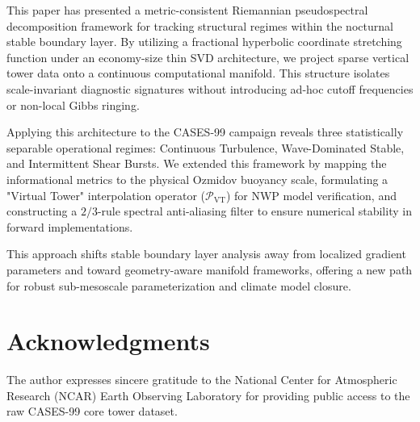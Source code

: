 This paper has presented a metric-consistent Riemannian pseudospectral decomposition framework for tracking structural regimes within the nocturnal stable boundary layer. By utilizing a fractional hyperbolic coordinate stretching function under an economy-size thin SVD architecture, we project sparse vertical tower data onto a continuous computational manifold. This structure isolates scale-invariant diagnostic signatures without introducing ad-hoc cutoff frequencies or non-local Gibbs ringing.

Applying this architecture to the CASES-99 campaign reveals three statistically separable operational regimes: Continuous Turbulence, Wave-Dominated Stable, and Intermittent Shear Bursts. We extended this framework by mapping the informational metrics to the physical Ozmidov buoyancy scale, formulating a "Virtual Tower" interpolation operator ($\mathcal{P}_{\text{VT}}$) for NWP model verification, and constructing a $2/3$-rule spectral anti-aliasing filter to ensure numerical stability in forward implementations.

This approach shifts stable boundary layer analysis away from localized gradient parameters and toward geometry-aware manifold frameworks, offering a new path for robust sub-mesoscale parameterization and climate model closure.

\section*{Acknowledgments}
The author expresses sincere gratitude to the National Center for Atmospheric Research (NCAR) Earth Observing Laboratory for providing public access to the raw CASES-99 core tower dataset.




